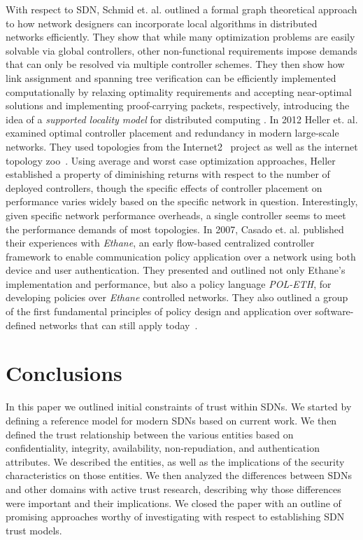 \documentclass[10pt,conference]{IEEEtran}
\begin{document}
With respect to SDN, Schmid et. al. outlined a formal graph theoretical approach to how network designers can incorporate local algorithms in distributed networks efficiently.  They show that while many optimization problems are easily solvable via global controllers, other non-functional requirements impose demands that can only be resolved via multiple controller schemes. They then show how link assignment and spanning tree verification can be efficiently implemented computationally by relaxing optimality requirements and accepting near-optimal solutions and implementing proof-carrying packets, respectively, introducing the idea of a {\sl supported locality model} for distributed computing \cite{ScSu:13}.  In 2012 Heller et. al. examined optimal controller placement and redundancy in modern large-scale networks. They used topologies from the Internet2~\cite{internet2} project as well as the internet topology zoo~\cite{internet-topo-zoo}. Using average and worst case optimization approaches, Heller established a property of diminishing returns with respect to the number of deployed controllers, though the specific effects of controller placement on performance varies widely based on the specific network in question.  Interestingly, given specific network performance overheads, a single controller seems to meet the performance demands of most topologies\cite{HeShMc:12}.  In 2007, Casado et. al. published their experiences with {\sl Ethane}, an early flow-based centralized controller framework to enable communication policy application over a network using both device and user authentication.  They presented and outlined not only Ethane's implementation and performance, but also a policy language {\sl POL-ETH}, for developing policies over {\sl Ethane} controlled networks.  They also outlined a group of the first fundamental principles of policy design and application over software-defined networks that can still apply today~\cite{CaFrPeLu:07}.

\section{Conclusions}
In this paper we outlined initial constraints of trust within SDNs.  We started by defining a reference model for modern SDNs based on current work.  We then defined the trust relationship between the various entities based on confidentiality, integrity, availability, non-repudiation, and authentication attributes.  We described the entities, as well as the implications of the security characteristics on those entities.  We then analyzed the differences between SDNs and other domains with active trust research, describing why those differences were important and their implications.  We closed the paper with an outline of promising approaches worthy of investigating with respect to establishing SDN trust models.
\end{document}
